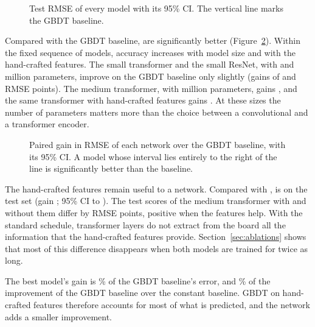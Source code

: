 \documentclass[11pt]{article}
\begin{document}
\begin{figure}[htbp]\centering
{}
\caption{Test RMSE of every model with its 95\% CI. The vertical line marks
the GBDT baseline.}
\label{fig:scores}
\end{figure}

Compared with the GBDT baseline,  are significantly
better (Figure~\ref{fig:gains}). Within the fixed sequence of models, accuracy
increases with model size and with the hand-crafted features. The small
transformer and the small ResNet, with
 and
 million parameters, improve on the
GBDT baseline only slightly (gains of  and
 RMSE points). The medium transformer, with
 million parameters, gains
, and the same transformer with hand-crafted
features gains . At these sizes the
number of parameters matters more than the choice between a convolutional
and a transformer encoder.

\begin{figure}[htbp]\centering
{}
\caption{Paired gain in RMSE of each network over the GBDT baseline, with
its 95\% CI. A model whose interval lies entirely to the right of the line is
significantly better than the baseline.}
\label{fig:gains}
\end{figure}

The hand-crafted features remain useful to a network.
\ifpairs
Compared with ,  is
 on the test set
(gain ; 95\% CI
 to
).
\else
The test scores of the medium transformer with and without them differ by
 RMSE points, positive when the
features help.
\fi
With the standard schedule,  transformer
layers do not extract from the board all the information that the
hand-crafted features provide.
\ifvariants
Section~\ref{sec:ablations} shows that most of this difference disappears
when both models are trained for twice as long.
\fi

The best model's gain is \% of the GBDT baseline's
error, and \% of the improvement of the GBDT baseline
over the constant baseline. GBDT on hand-crafted features therefore accounts
for most of what is predicted, and the network adds a smaller improvement.
\end{document}
